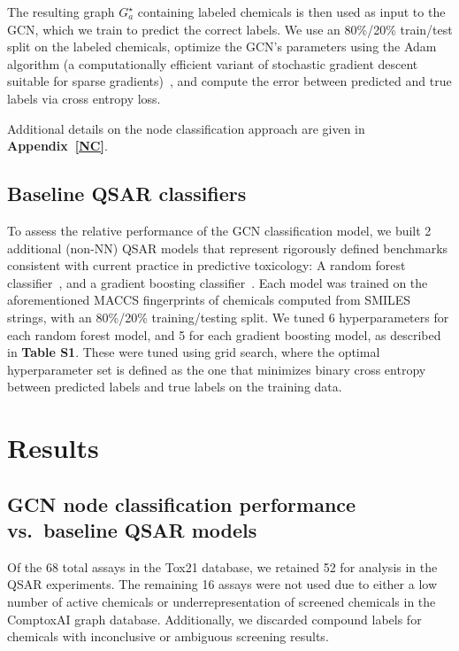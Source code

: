 \documentclass{ws-procs11x85}
\begin{document}
The resulting graph $G_a^\star$ containing labeled chemicals is then used as input to the GCN, which we train to predict the correct labels.
We use an 80\%/20\% train/test split on the labeled chemicals, optimize the GCN's parameters using the Adam algorithm (a computationally efficient variant of stochastic gradient descent suitable for sparse gradients)~\cite{kingma2014adam}, and compute the error between predicted and true labels via cross entropy loss.

Additional details on the node classification approach are given in \textbf{Appendix~\ref{NC}}.

\subsection{Baseline QSAR classifiers}
To assess the relative performance of the GCN classification model, we built 2 additional (non-NN) QSAR models that represent rigorously defined benchmarks consistent with current practice in predictive toxicology: A random forest classifier~\cite{svetnik2003random}, and a gradient boosting classifier~\cite{sheridan2016extreme}.
Each model was trained on the aforementioned MACCS fingerprints of chemicals computed from SMILES strings, with an 80\%/20\% training/testing split.
We tuned 6 hyperparameters for each random forest model, and 5 for each gradient boosting model, as described in \textbf{Table S1}.
These were tuned using grid search, where the optimal hyperparameter set is defined as the one that minimizes binary cross entropy between predicted labels and true labels on the training data.

\section{Results}
\subsection{GCN node classification performance vs.\ baseline QSAR models}
Of the 68 total assays in the Tox21 database, we retained 52 for analysis in the QSAR experiments.
The remaining 16 assays were not used due to either a low number of active chemicals or underrepresentation of screened chemicals in the ComptoxAI graph database.
Additionally, we discarded compound labels for chemicals with inconclusive or ambiguous screening results.
\end{document}
